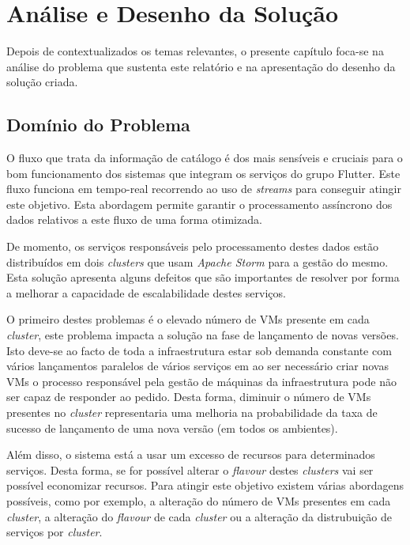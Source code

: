 \chapter{Análise e Desenho da Solução}
\label{sec:3-Analise}

Depois de contextualizados os temas relevantes, o presente capítulo foca-se na análise do problema 
que sustenta este relatório e na apresentação do desenho da solução criada.

\section{Domínio do Problema}

O fluxo que trata da informação de catálogo é dos mais sensíveis e cruciais para o bom funcionamento
dos sistemas que integram os serviços do grupo Flutter. Este fluxo funciona em tempo-real recorrendo
ao uso de \textit{streams} para conseguir atingir este objetivo. Esta abordagem permite garantir
o processamento assíncrono dos dados relativos a este fluxo de uma forma otimizada.

De momento, os serviços responsáveis pelo processamento destes dados estão distribuídos em dois
\textit{clusters} que usam \textit{Apache Storm} para a gestão do mesmo. Esta solução apresenta alguns
defeitos que são importantes de resolver por forma a melhorar a capacidade de escalabilidade destes
serviços. 

O primeiro destes problemas é o elevado número de \acp{VM} presente em cada \textit{cluster},
este problema impacta a solução na fase de lançamento de novas versões. Isto deve-se ao facto de
toda a infraestrutura estar sob demanda constante com vários lançamentos paralelos de vários serviços
em ao ser necessário criar novas \acp{VM} o processo responsável pela gestão de máquinas da
infraestrutura pode não ser capaz de responder ao pedido. Desta forma, diminuir o número de \acp{VM}
presentes no \textit{cluster} representaria uma melhoria na probabilidade da taxa de sucesso de
lançamento de uma nova versão (em todos os ambientes).

Além disso, o sistema está a usar um excesso de recursos para determinados serviços. Desta forma,
se for possível alterar o \textit{\gls{flavour}} destes \textit{clusters} vai ser possível economizar
recursos. Para atingir este objetivo existem várias abordagens possíveis, como por exemplo, a
alteração do número de \acp{VM} presentes em cada \textit{cluster}, a alteração do \textit{\gls{flavour}}
de cada \textit{cluster} ou a alteração da distrubuição de serviços por \textit{cluster}.

